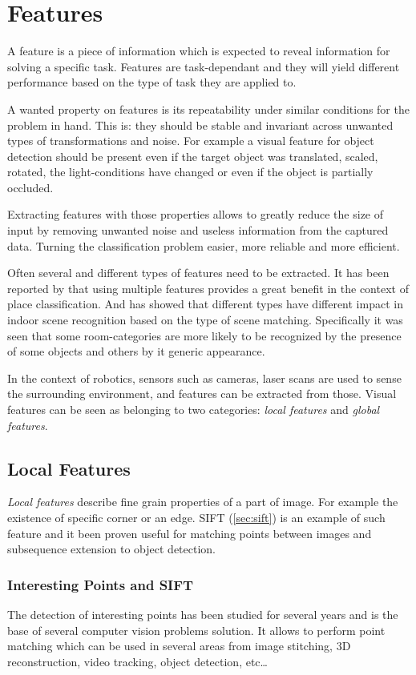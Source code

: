 \section{Features}
A feature is a piece of information which is expected to reveal information for
solving a specific task. Features are task-dependant and they will
yield different performance based on the type of task they are applied to.

A wanted property on features is its repeatability under similar conditions for
the problem in hand. This is: they should be stable and invariant across
unwanted types of transformations and noise. For example a visual feature for
object detection should be present even if the target object was translated,
scaled, rotated, the light-conditions have changed or even if the object is
partially occluded.

Extracting features with those properties allows to greatly reduce the size of
input by removing unwanted noise and useless information from the captured data.
Turning the classification problem easier, more reliable and more efficient.

Often several and different types of features need to be extracted. It has been
reported by \cite{pronobis2010ijrr} that using multiple features provides a
great benefit in the context of place classification.
And \cite{quattoni2009recognizing} has showed that different types have
different impact in indoor scene recognition based on the type of scene
matching. Specifically it was seen that some room-categories are more likely to be
recognized by the presence of some objects and others by it generic appearance.

In the context of robotics, sensors such as cameras, laser scans are used to
sense the surrounding environment, and features can be extracted from those.
Visual features can be seen as belonging to two categories:
\emph{local features} and \emph{global features}.


\subsection{Local Features}
\label{sec:local-features}
\emph{Local features} describe fine grain properties of a part of image.
For example the existence of specific corner or an edge. \Gls{SIFT}
(\autoref{sec:sift}) is an example of such feature and it been proven useful
for matching points between images and subsequence extension to object detection.

\subsubsection*{Interesting Points and SIFT}
\label{sec:sift}
The detection of interesting points has been studied for several years and is
the base of several computer vision problems solution. It allows to perform
point matching which can be used in several areas from image stitching,
3D reconstruction, video tracking, object detection, etc\dots

